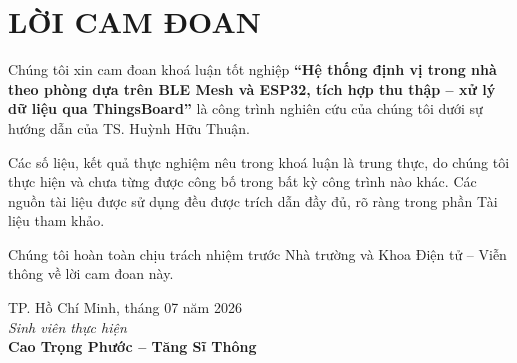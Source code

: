 \chapter*{LỜI CAM ĐOAN}
\label{camdoan}

Chúng tôi xin cam đoan khoá luận tốt nghiệp \textbf{``Hệ thống định vị trong nhà theo phòng dựa trên BLE Mesh và ESP32, tích hợp thu thập -- xử lý dữ liệu qua ThingsBoard''} là công trình nghiên cứu của chúng tôi dưới sự hướng dẫn của TS. Huỳnh Hữu Thuận.

Các số liệu, kết quả thực nghiệm nêu trong khoá luận là trung thực, do chúng tôi thực hiện và chưa từng được công bố trong bất kỳ công trình nào khác. Các nguồn tài liệu được sử dụng đều được trích dẫn đầy đủ, rõ ràng trong phần Tài liệu tham khảo.

Chúng tôi hoàn toàn chịu trách nhiệm trước Nhà trường và Khoa Điện tử -- Viễn thông về lời cam đoan này.

\vspace{2em}

\begin{flushright}
    TP. Hồ Chí Minh, tháng 07 năm 2026\\
    \textit{Sinh viên thực hiện}\\
    \vspace{4em}
    \textbf{Cao Trọng Phước -- Tăng Sĩ Thông}
\end{flushright}
